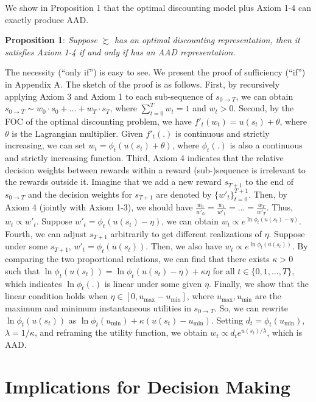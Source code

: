 \documentclass[
  12pt,
]{article}
\begin{document}
We show in Proposition 1 that the optimal discounting model plus Axiom
1-4 can exactly produce AAD.

\noindent \textbf{Proposition 1}: \emph{Suppose} \(\succsim\) \emph{has
an optimal discounting representation, then it satisfies Axiom 1-4 if
and only if has an AAD representation.}

The necessity (``only if'') is easy to see. We present the proof of
sufficiency (``if'') in Appendix A. The sketch of the proof is as
follows. First, by recursively applying Axiom 3 and Axiom 1 to each
sub-sequence of \(s_{0\rightarrow T}\), we can obtain
\(s_{0\rightarrow T}\sim w_0\cdot s_0+...+w_T\cdot s_T\), where
\(\sum_{t=0}^T w_t = 1\) and \(w_t>0\). Second, by the FOC of the
optimal discounting problem, we have \(f'_t(w_t)=u(s_t)+\theta\), where
\(\theta\) is the Lagrangian multiplier. Given \(f'_t(.)\) is continuous
and strictly increasing, we can set \(w_t=\phi_t(u(s_t)+\theta)\), where
\(\phi_t(.)\) is also a continuous and strictly increasing function.
Third, Axiom 4 indicates that the relative decision weights between
rewards within a reward (sub-)sequence is irrelevant to the rewards
outside it. Imagine that we add a new reward \(s_{T+1}\) to the end of
\(s_{0\rightarrow T}\) and the decision weights for \(s_{T+1}\) are
denoted by \(\{w'_t\}_{t=0}^{T+1}\). Then, by Axiom 4 (jointly with
Axiom 1-3), we should have
\(\frac{w_0}{w'_0}=\frac{w_1}{w'_1}=...=\frac{w_T}{w'_T}\). Thus,
\(w_t \propto w'_t\). Suppose \(w'_t=\phi_t(u(s_t)-\eta)\), we can
obtain \(w_t \propto e^{\ln\phi_t(u(s_t)-\eta)}\). Fourth, we can adjust
\(s_{T+1}\) arbitrarily to get different realizations of \(\eta\).
Suppose under some \(s_{T+1}\), \(w'_t = \phi_t(u(s_t))\). Then, we also
have \(w_t \propto e^{\ln\phi_t(u(s_t))}\). By comparing the two
proportional relations, we can find that there exists \(\kappa>0\) such
that \(\ln\phi_t(u(s_t))=\ln\phi_t(u(s_t)-\eta)+\kappa\eta\) for all
\(t\in\{0,1,…,T\}\), which indicates \(\ln \phi_t(.)\) is linear under
some given \(\eta\). Finally, we show that the linear condition holds
when \(\eta\in[0,u_{\max}-u_{\min}]\), where \(u_{\max},u_{\min}\) are
the maximum and minimum instantaneous utilities in
\(s_{0\rightarrow T}\). So, we can rewrite \(\ln\phi_t(u(s_t))\) as
\(\ln\phi_t(u_{\min})+\kappa(u(s_t)-u_{\min})\). Setting
\(d_t=\phi_t(u_{\min})\), \(\lambda =1/\kappa\), and reframing the
utility function, we obtain \(w_t \propto d_t e^{u(s_t)/\lambda}\),
which is AAD.

\hypertarget{implications-for-decision-making}{%
\section{Implications for Decision
Making}\label{implications-for-decision-making}}
\end{document}
